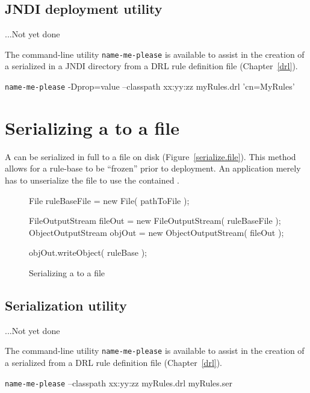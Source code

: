 \subsection{JNDI deployment utility}

\begin{implnote}
...Not yet done
\end{implnote}

The command-line utility \texttt{name-me-please} is available to
assist in the creation of a serialized  in
a JNDI directory from a DRL rule definition file (Chapter~\vref{drl}).

\begin{javaCodelisting}
\texttt{name-me-please} -Dprop=value --classpath xx:yy:zz myRules.drl 'cn=MyRules'
\end{javaCodelisting}

\section{Serializing a  to a file}

A  can be serialized in full to a file
on disk (Figure~\vref{serialize.file}).  This method allows for a rule-base to be ``frozen'' prior
to deployment.  An application merely has to unserialize the
file to use the contained .

\begin{figure}
\begin{javaCodelisting}
File ruleBaseFile = new File( pathToFile );

FileOutputStream   fileOut = new FileOutputStream( ruleBaseFile );
ObjectOutputStream objOut  = new ObjectOutputStream( fileOut );

objOut.writeObject( ruleBase );
\end{javaCodelisting}
\caption{Serializing a  to a file}
\label{serialize.file}
\end{figure}

\subsection{Serialization utility}

\begin{implnote}
...Not yet done
\end{implnote}

The command-line utility \texttt{name-me-please} is available to
assist in the creation of a serialized  from 
a DRL rule definition file (Chapter~\vref{drl}).

\begin{javaCodelisting}
\texttt{name-me-please} --classpath xx:yy:zz myRules.drl myRules.ser
\end{javaCodelisting}

